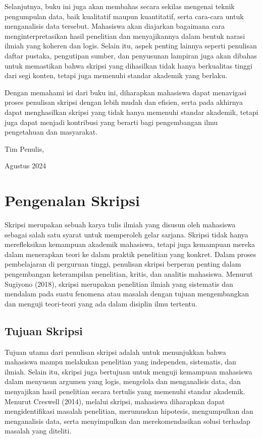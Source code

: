 \documentclass[
  indonesian,
  letterpaper,
]{scrbook}
\begin{document}
Selanjutnya, buku ini juga akan membahas secara sekilas mengenai teknik
pengumpulan data, baik kualitatif maupun kuantitatif, serta cara-cara
untuk menganalisis data tersebut. Mahasiswa akan diajarkan bagaimana
cara menginterpretasikan hasil penelitian dan menyajikannya dalam bentuk
narasi ilmiah yang koheren dan logis. Selain itu, aspek penting lainnya
seperti penulisan daftar pustaka, pengutipan sumber, dan penyusunan
lampiran juga akan dibahas untuk memastikan bahwa skripsi yang
dihasilkan tidak hanya berkualitas tinggi dari segi konten, tetapi juga
memenuhi standar akademik yang berlaku.

Dengan memahami isi dari buku ini, diharapkan mahasiswa dapat menavigasi
proses penulisan skripsi dengan lebih mudah dan efisien, serta pada
akhirnya dapat menghasilkan skripsi yang tidak hanya memenuhi standar
akademik, tetapi juga dapat menjadi kontribusi yang berarti bagi
pengembangan ilmu pengetahuan dan masyarakat. ~

Tim Penulis,

Agustus 2024


\chapter{Pengenalan Skripsi}\label{pengenalan-skripsi}

Skripsi merupakan sebuah karya tulis ilmiah yang disusun oleh mahasiswa
sebagai salah satu syarat untuk memperoleh gelar sarjana. Skripsi tidak
hanya merefleksikan kemampuan akademik mahasiswa, tetapi juga kemampuan
mereka dalam menerapkan teori ke dalam praktik penelitian yang konkret.
Dalam proses pembelajaran di perguruan tinggi, penulisan skripsi
berperan penting dalam pengembangan keterampilan penelitian, kritis, dan
analitis mahasiswa. Menurut Sugiyono (2018), skripsi merupakan
penelitian ilmiah yang sistematis dan mendalam pada suatu fenomena atau
masalah dengan tujuan mengembangkan dan menguji teori-teori yang ada
dalam disiplin ilmu tertentu.

\section{Tujuan Skripsi}\label{tujuan-skripsi}

Tujuan utama dari penulisan skripsi adalah untuk menunjukkan bahwa
mahasiswa mampu melakukan penelitian yang independen, sistematis, dan
ilmiah. Selain itu, skripsi juga bertujuan untuk menguji kemampuan
mahasiswa dalam menyusun argumen yang logis, mengelola dan menganalisis
data, dan menyajikan hasil penelitian secara tertulis yang memenuhi
standar akademik. Menurut Creswell (2014), melalui skripsi, mahasiswa
diharapkan dapat mengidentifikasi masalah penelitian, merumuskan
hipotesis, mengumpulkan dan menganalisis data, serta menyimpulkan dan
merekomendasikan solusi terhadap masalah yang diteliti.
\end{document}
